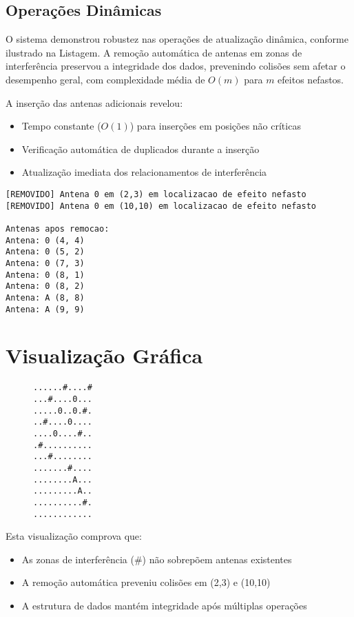 \documentclass[a4paper,12pt]{report}
\begin{document}
\subsection{Operações Dinâmicas}
O sistema demonstrou robustez nas operações de atualização dinâmica, conforme ilustrado na Listagem. A remoção automática de antenas em zonas de interferência preservou a integridade dos dados, prevenindo colisões sem afetar o desempenho geral, com complexidade média de \(O(m)\) para \(m\) efeitos nefastos.

A inserção das antenas adicionais revelou:
\begin{itemize}
    \item Tempo constante (\(O(1)\)) para inserções em posições não críticas
    \item Verificação automática de duplicados durante a inserção
    \item Atualização imediata dos relacionamentos de interferência
\end{itemize}

\begin{lstlisting}[caption={Estado final após operações},label={lst:operacoes},basicstyle=\ttfamily\small]
[REMOVIDO] Antena 0 em (2,3) em localizacao de efeito nefasto
[REMOVIDO] Antena 0 em (10,10) em localizacao de efeito nefasto

Antenas apos remocao:
Antena: 0 (4, 4)
Antena: 0 (5, 2)
Antena: 0 (7, 3)
Antena: 0 (8, 1)
Antena: 0 (8, 2)
Antena: A (8, 8)
Antena: A (9, 9)
\end{lstlisting}

\section{Visualização Gráfica}
\begin{figure}[H]
\begin{lstlisting}[caption={Mapa final com interferências},label={lst:mapa_final},basicstyle=\ttfamily\small]
......#....#
...#....0...
.....0..0.#.
..#....0....
....0....#..
.#..........
...#........
.......#....
........A...
.........A..
..........#.
............
\end{lstlisting}
\label{fig:mapa_final}
\end{figure}

Esta visualização comprova que:
\begin{itemize}
    \item As zonas de interferência (\#) não sobrepõem antenas existentes
    \item A remoção automática preveniu colisões em (2,3) e (10,10)
    \item A estrutura de dados mantém integridade após múltiplas operações
\end{itemize}
\end{document}
